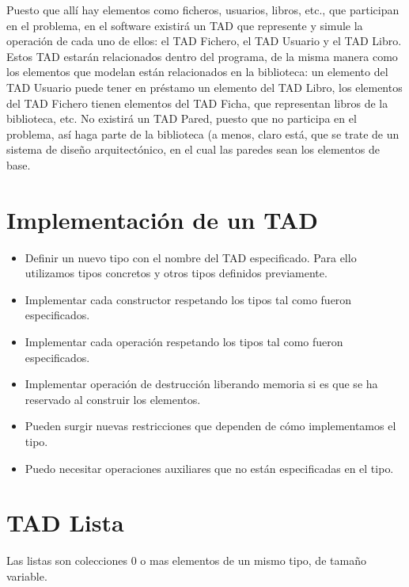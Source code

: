 Puesto que allí hay elementos como ficheros, usuarios, libros, etc., que participan en el problema, en el software existirá un TAD que represente y simule la operación de cada uno de ellos: el TAD Fichero, el TAD Usuario y el TAD Libro. Estos TAD estarán relacionados dentro del programa, de la misma manera como los elementos que modelan están relacionados en la biblioteca: un elemento del TAD Usuario puede tener en préstamo un elemento del TAD Libro, los elementos del TAD Fichero tienen elementos del TAD Ficha, que representan libros de la biblioteca, etc. No existirá un TAD Pared, puesto que no participa en el problema, así haga parte de la biblioteca (a menos, claro está, que se trate de un sistema de diseño arquitectónico, en el cual las paredes sean los elementos de base.

\section{Implementación de un TAD}
\begin{itemize}
    \item Definir un nuevo tipo con el nombre del TAD especificado. Para ello utilizamos tipos concretos y otros tipos definidos previamente.
    \item Implementar cada constructor respetando los tipos tal como fueron especificados.
    \item Implementar cada operación respetando los tipos tal como fueron especificados.
    \item Implementar operación de destrucción liberando memoria si es que se ha reservado al construir los elementos.
    \item Pueden surgir nuevas restricciones que dependen de cómo implementamos el tipo.
    \item Puedo necesitar operaciones auxiliares que no están especificadas en el tipo.
\end{itemize}

\section{TAD Lista}
Las listas son colecciones 0 o mas elementos de un mismo tipo, de tamaño variable.

